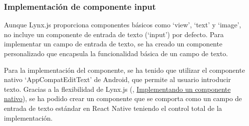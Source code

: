 \subsubsection{Implementación de componente input}

Aunque Lynx.js proporciona componentes básicos como `view', `text' y `image', no incluye un componente de entrada de texto (`input') por defecto.
Para implementar un campo de entrada de texto, se ha creado un componente personalizado que encapsula la funcionalidad básica de un campo de texto.

Para la implementación del componente, se ha tenido que utilizar el componente nativo `AppCompatEditText' de Android, que permite al usuario introducir texto.
Gracias a la flexibilidad de Lynx.js (\cite{lynx-documentation}, \href{https://lynxjs.org/guide/custom-native-component.html#platform=android}{Implementando un componente nativo}), se ha podido crear un componente que se comporta como un campo de entrada de texto estándar en React Native teniendo el control total de la implementación.
